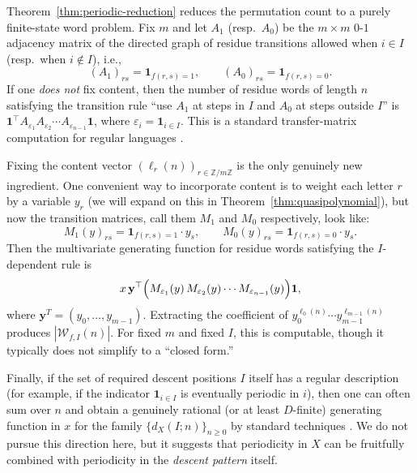 \documentclass[12pt]{amsart}
\theoremstyle{definition}
\theoremstyle{remark}
\newcommand{\Z}{\mathbb{Z}}
\newcommand{\abs}[1]{\left|#1\right|}
\begin{document}
Theorem~\ref{thm:periodic-reduction} reduces the permutation count to a purely finite-state word problem.
Fix $m$ and let $A_1$ (resp.\ $A_0$) be the $m\times m$ $0$-$1$ adjacency matrix of the directed graph of residue
transitions allowed when $i\in I$ (resp.\ when $i\notin I$), i.e.,
\[
(A_1)_{rs}=\mathbf{1}_{f(r,s)=1},\qquad (A_0)_{rs}=\mathbf{1}_{f(r,s)=0}.
\]
If one \emph{does not} fix content, then the number of residue words of length $n$ satisfying the transition rule
``use $A_1$ at steps in $I$ and $A_0$ at steps outside $I$'' is 
$\mathbf{1}^\top A_{\varepsilon_1}A_{\varepsilon_2}\cdots A_{\varepsilon_{n-1}}\mathbf{1}$, where
$\varepsilon_i=\mathbf{1}_{i\in I}$.
This is a standard transfer-matrix computation for regular languages \cite{flajolet-sedgewick}.

Fixing the content vector $(\ell_r(n))_{r\in\Z/m\Z}$ is the only genuinely new ingredient.
One convenient way to incorporate content is to weight each letter $r$ by a variable $y_r$ (we will expand on this in
Theorem~\ref{thm:quasipolynomial}), but now the transition matrices, call them $M_1$ and $M_0$ respectively, look like:
\[
M_1(y)_{rs}=\mathbf{1}_{f(r,s)=1} \cdot y_s,\qquad M_0(y)_{rs}=\mathbf{1}_{f(r,s)=0} \cdot y_s.
\]
Then the multivariate generating function for residue words satisfying the $I$-dependent rule is
\[
x\,\mathbf{y}^\top\Bigl(M_{\varepsilon_1}(y)\,M_{\varepsilon_2}(y)\cdots M_{\varepsilon_{n-1}}(y)\Bigr)\mathbf{1},
\]
where $\mathbf{y}^T=(y_0,\ldots,y_{m-1})$. Extracting the coefficient of $y_0^{\ell_0(n)}\cdots y_{m-1}^{\ell_{m-1}(n)}$ produces $\abs{\mathcal{W}_{f,I}(n)}$.
For fixed $m$ and fixed $I$, this is computable, though it
typically does not simplify to a ``closed form.''  

Finally, if the set of required descent positions $I$ itself has a regular description (for example, if the indicator
$\mathbf{1}_{i\in I}$ is eventually periodic in $i$), then one can often sum over $n$ and obtain a genuinely rational
(or at least $D$-finite) generating function in $x$ for the family $\{d_X(I;n)\}_{n\ge 0}$ by standard 
techniques \cite{flajolet-sedgewick}.  We do not pursue this direction here, but it suggests that periodicity in $X$
can be fruitfully combined with periodicity in the \emph{descent pattern} itself.
\end{document}
